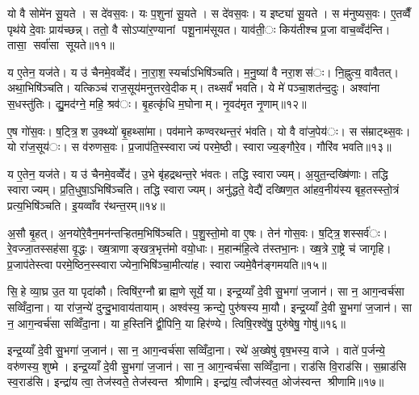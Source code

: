 
यो वै सोमे॑न सू॒यते। स दे॑वस॒वः। यः प॒शुना॑ सू॒यते। स दे॑वस॒वः। य इष्ट्या॑ सू॒यते। स म॑नुष्यस॒वः। ए॒तव्वैँ पृथ॑ये दे॒वाः प्राय॑च्छन्न्। ततो॒ वै सोऽप्या॑र॒ण्यानां पशू॒नाम॑सूयत। याव॑ती॒ः किय॑तीश्च प्र॒जा वाच॒व्वँद॑न्ति। तासा॒ सर्वा॑सा सूयते॥११॥

य ए॒तेन॒ यज॑ते। य उ॑ चैनमे॒वव्वेँद॑। ना॒रा॒श॒स्यर्चाऽभिषि॑ञ्चति। म॒नु॒ष्या॑ वै नरा॒शस॑ः। नि॒ह्नुत्य॒ वावैतत्। अथा॒भिषि॑ञ्चति। यत्किञ्च॑ राज॒सूय॑मनुत्तरवे॒दीकम्। तथ्सर्वं॑ भवति। ये मे॑ पञ्चा॒शत॑न्द॒दुः। अश्वा॑ना स॒धस्तु॑तिः। द्यु॒मद॑ग्ने॒ महि॒ श्रव॑ः। बृ॒हत्कृ॑धि म॒घोनाम्। नृ॒वद॑मृत नृ॒णाम्॥१२॥


ए॒ष गो॑स॒वः। ष॒ट्त्रि॒श उ॒क्थ्यो॑ बृ॒हथ्सा॑मा। पव॑माने कण्वरथन्त॒रं भ॑वति। यो वै वा॑ज॒पेय॑ः। स स॑म्राट्थ्स॒वः। यो रा॑ज॒सूय॑ः। स व॑रुणस॒वः। प्र॒जाप॑ति॒स्स्वाराज्यं परमे॒ष्ठी। स्वाराज्य॒ङ्गौरे॒व। गौरि॑व भवति॥१३॥

य ए॒तेन॒ यज॑ते। य उ॑ चैनमे॒वव्वेँद॑। उ॒भे बृ॑हद्रथन्त॒रे भ॑वतः। तद्धि स्वाराज्यम्। अ॒युत॒न्दख्षि॑णाः। तद्धि स्वाराज्यम्। प्र॒ति॒धुषा॒ऽभिषि॑ञ्चति। तद्धि स्वाराज्यम्। अनु॑द्धते॒ वेद्यै॑ दख्षिण॒त आ॑हव॒नीय॑स्य बृह॒तस्स्तो॒त्रं प्रत्य॒भिषि॑ञ्चति। इ॒यव्वाँव र॑थन्त॒रम्॥१४॥

अ॒सौ बृ॒हत्। अ॒नयो॑रे॒वैन॒मन॑न्तऱ्हितम॒भिषि॑ञ्चति। प॒शु॒स्तो॒मो वा ए॒षः। तेन॑ गोस॒वः। ष॒ट्त्रि॒शस्सर्व॑ः। रे॒वज्जा॒तस्सह॑सा वृ॒द्धः। ख्ष॒त्राणाङ्खत्र॒भृत्त॑मो वयो॒धाः। म॒हान्म॑हि॒त्वे त॑स्तभा॒नः। ख्ष॒त्रे रा॒ष्ट्रे च॑ जागृहि। प्र॒जाप॑तेस्त्वा परमे॒ष्ठिन॒स्स्वाराज्येना॒भिषि॑ञ्चा॒मीत्या॑ह। स्वाराज्यमे॒वैन॑ङ्गमयति॥१५॥


सि॒हे व्या॒घ्र उ॒त या पृदा॑कौ। त्विषि॑र॒ग्नौ ब्राह्म॒णे सूर्ये॒ या। इन्द्र॒य्याँ दे॒वी सु॒भगा॑ ज॒जान॑। सा न॒ आग॒न्वर्च॑सा सव्विँदा॒ना। या रा॑ज॒न्ये॑ दुन्दु॒भावाय॑तायाम्। अश्व॑स्य॒ क्रन्द्ये॒ पुरु॑षस्य मा॒यौ। इन्द्र॒य्याँ दे॒वी सु॒भगा॑ ज॒जान॑। सा न॒ आग॒न्वर्च॑सा सव्विँदा॒ना। या ह॒स्तिनि॑ द्वी॒पिनि॒ या हिर॑ण्ये। त्विषि॒रश्वे॑षु॒ पुरु॑षेषु॒ गोषु॑॥१६॥

इन्द्र॒य्याँ दे॒वी सु॒भगा॑ ज॒जान॑। सा न॒ आग॒न्वर्च॑सा सव्विँदा॒ना। रथे॑ अ॒ख्षेषु॑ वृष॒भस्य॒ वाजे। वाते॑ प॒र्जन्ये॒ वरु॑णस्य॒ शुष्मे। इन्द्र॒य्याँ दे॒वी सु॒भगा॑ ज॒जान॑। सा न॒ आग॒न्वर्च॑सा सव्विँदा॒ना। राड॑सि वि॒राड॑सि। स॒म्राड॑सि स्व॒राड॑सि। इन्द्रा॑य त्वा॒ तेज॑स्वते॒ तेज॑स्वन्त श्रीणामि। इन्द्रा॑य॒ त्वौज॑स्वत॒ ओज॑स्वन्त श्रीणामि॥१७॥

